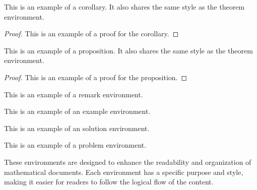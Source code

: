 \begin{corollary}
  This is an example of a corollary. It also shares the same style as the theorem environment.
\end{corollary}
\begin{proof}
  This is an example of a proof for the corollary.
\end{proof}

\begin{proposition}
  This is an example of a proposition. It also shares the same style as the theorem environment.
\end{proposition}
\begin{proof}
  This is an example of a proof for the proposition.
\end{proof}

\begin{remark}
  This is an example of a remark environment.
\end{remark}

\begin{example}
  This is an example of an example environment.
\end{example}

\begin{solution}
  This is an example of an solution environment.
\end{solution}

\begin{problem}
  This is an example of a problem environment.
\end{problem}

These environments are designed to enhance the readability and organization of mathematical documents. 
Each environment has a specific purpose and style, making it easier for readers to follow the logical flow of the content.